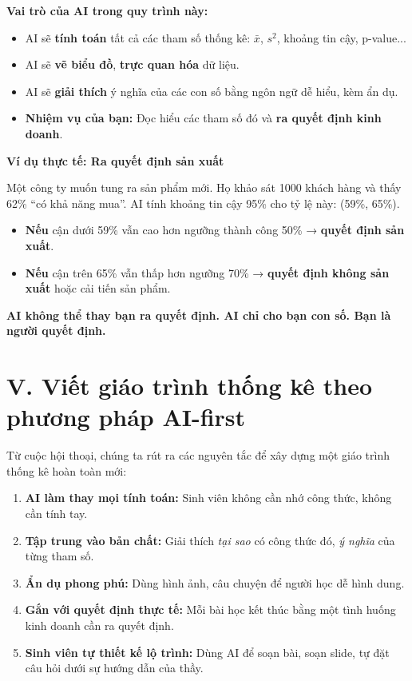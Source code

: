 \documentclass[a4paper,12pt]{article}
\theoremstyle{remark}
\begin{document}
\begin{aibox}
\textbf{Vai trò của AI trong quy trình này:}

\begin{itemize}
    \item AI sẽ \textbf{tính toán} tất cả các tham số thống kê: \(\bar{x}\), \(s^2\), khoảng tin cậy, p-value...
    \item AI sẽ \textbf{vẽ biểu đồ}, \textbf{trực quan hóa} dữ liệu.
    \item AI sẽ \textbf{giải thích} ý nghĩa của các con số bằng ngôn ngữ dễ hiểu, kèm ẩn dụ.
    \item \textbf{Nhiệm vụ của bạn:} Đọc hiểu các tham số đó và \textbf{ra quyết định kinh doanh}.
\end{itemize}
\end{aibox}

\begin{bizbox}
\textbf{Ví dụ thực tế: Ra quyết định sản xuất}

Một công ty muốn tung ra sản phẩm mới. Họ khảo sát 1000 khách hàng và thấy 62\% “có khả năng mua”. AI tính khoảng tin cậy 95\% cho tỷ lệ này: (59\%, 65\%).

\begin{itemize}
    \item \textbf{Nếu} cận dưới 59\% vẫn cao hơn ngưỡng thành công 50\% → \textbf{quyết định sản xuất}.
    \item \textbf{Nếu} cận trên 65\% vẫn thấp hơn ngưỡng 70\% → \textbf{quyết định không sản xuất} hoặc cải tiến sản phẩm.
\end{itemize}

\textbf{AI không thể thay bạn ra quyết định. AI chỉ cho bạn con số. Bạn là người quyết định.}
\end{bizbox}

\section*{\color{maincolor}V. Viết giáo trình thống kê theo phương pháp AI-first}

Từ cuộc hội thoại, chúng ta rút ra các nguyên tắc để xây dựng một giáo trình thống kê hoàn toàn mới:

\begin{enumerate}
    \item \textbf{AI làm thay mọi tính toán:} Sinh viên không cần nhớ công thức, không cần tính tay.
    \item \textbf{Tập trung vào bản chất:} Giải thích \textit{tại sao} có công thức đó, \textit{ý nghĩa} của từng tham số.
    \item \textbf{Ẩn dụ phong phú:} Dùng hình ảnh, câu chuyện để người học dễ hình dung.
    \item \textbf{Gắn với quyết định thực tế:} Mỗi bài học kết thúc bằng một tình huống kinh doanh cần ra quyết định.
    \item \textbf{Sinh viên tự thiết kế lộ trình:} Dùng AI để soạn bài, soạn slide, tự đặt câu hỏi dưới sự hướng dẫn của thầy.
\end{enumerate}
\end{document}
